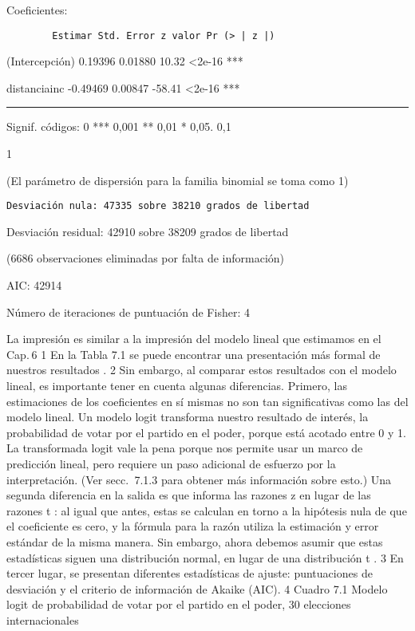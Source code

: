 \documentclass[
]{book}
\begin{document}
Coeficientes:

\begin{verbatim}
        Estimar Std. Error z valor Pr (> | z |)
\end{verbatim}

(Intercepción) 0.19396 0.01880 10.32 \textless2e-16 ***

distanciainc -0.49469 0.00847 -58.41 \textless2e-16 ***

\begin{center}\rule{0.5\linewidth}{0.5pt}\end{center}

Signif. códigos: 0 *** 0,001 ** 0,01 * 0,05. 0,1

1

(El parámetro de dispersión para la familia binomial se toma como 1)

\begin{verbatim}
Desviación nula: 47335 sobre 38210 grados de libertad
\end{verbatim}

Desviación residual: 42910 sobre 38209 grados de libertad

(6686 observaciones eliminadas por falta de información)

AIC: 42914

Número de iteraciones de puntuación de Fisher: 4

La impresión es similar a la impresión del modelo lineal que estimamos en el Cap. 6 1 En la Tabla 7.1 se puede encontrar una presentación más formal de nuestros resultados . 2 Sin embargo, al comparar estos resultados con el modelo lineal, es importante tener en cuenta algunas diferencias. Primero, las estimaciones de los coeficientes en sí mismas no son tan significativas como las del modelo lineal. Un modelo logit transforma nuestro resultado de interés, la probabilidad de votar por el partido en el poder, porque está acotado entre 0 y 1. La transformada logit vale la pena porque nos permite usar un marco de predicción lineal, pero requiere un paso adicional de esfuerzo por la interpretación. (Ver secc.  7.1.3 para obtener más información sobre esto.) Una segunda diferencia en la salida es que informa las razones z en lugar de las razones t : al igual que antes, estas se calculan en torno a la hipótesis nula de que el coeficiente es cero, y la fórmula para la razón utiliza la estimación y error estándar de la misma manera. Sin embargo, ahora debemos asumir que estas estadísticas siguen una distribución normal, en lugar de una distribución t . 3 En tercer lugar, se presentan diferentes estadísticas de ajuste: puntuaciones de desviación y el criterio de información de Akaike (AIC). 4
Cuadro 7.1
Modelo logit de probabilidad de votar por el partido en el poder, 30 elecciones internacionales
\end{document}
